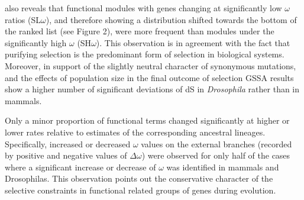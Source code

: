  also reveals that functional modules with genes changing at significantly low $\omega$ ratios (SL$\omega$), and therefore showing a distribution shifted towards the bottom of the ranked list (see Figure 2), were more frequent than modules under the significantly high $\omega$ (SH$\omega$). This observation is in agreement with the fact that purifying selection is the predominant form of selection in biological systems. Moreover, in support of the slightly neutral character of synonymous mutations, and the effects of population size in the final outcome of selection \cite{Lynch2007} GSSA results show a higher number of significant deviations of dS in \textit{Drosophila} rather than in mammals.

Only a minor proportion of functional terms changed significantly at higher or lower rates relative to estimates of the corresponding ancestral lineages. Specifically, increased or decreased $\omega$ values on the external branches (recorded by positive and negative values of $\Delta\omega$) were observed for only half of the cases where a significant increase or decrease of $\omega$ was identified in mammals and Drosophilas. This observation points out the conservative character of the selective constraints in functional related groups of genes during evolution.

